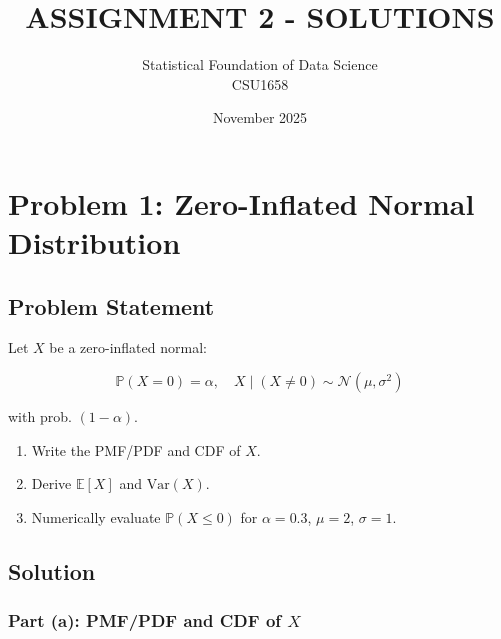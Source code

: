 \documentclass[12pt]{article}
\title{ASSIGNMENT 2 - SOLUTIONS}
\author{Statistical Foundation of Data Science\\
CSU1658}
\date{November 2025}
\begin{document}
\maketitle

\tableofcontents
\newpage

\section{Problem 1: Zero-Inflated Normal Distribution}

\subsection{Problem Statement}
Let \( X \) be a zero-inflated normal:

\[\mathbb{P}(X = 0) = \alpha, \quad X \mid (X \neq 0) \sim \mathcal{N}(\mu, \sigma^2)\]

with prob. \((1 - \alpha)\).

\begin{enumerate}
\item Write the PMF/PDF and CDF of \( X \).
\item Derive \(\mathbb{E}[X]\) and \(\text{Var}(X)\).
\item Numerically evaluate \(\mathbb{P}(X \leq 0)\) for \(\alpha = 0.3\), \(\mu = 2\), \(\sigma = 1\).
\end{enumerate}

\subsection{Solution}

\subsubsection{Part (a): PMF/PDF and CDF of \(X\)}
\end{document}
